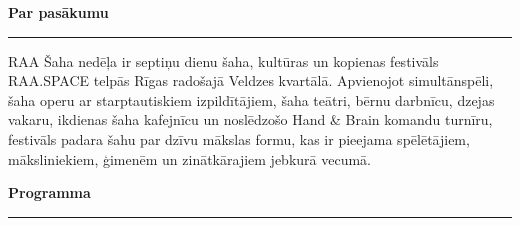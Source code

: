 \documentclass[a4paper,10pt]{article}
\newcommand{\sectionrule}[1]{%
  \vspace{3pt}%
  {\color{raared}\bfseries\large #1}\\[-3pt]%
  {\color{raared}\rule{\linewidth}{0.8pt}}%
  \vspace{2pt}%
}
\begin{document}
\begin{center}
\begin{minipage}{0.90\paperwidth}

\vspace{0.22cm}

\sectionrule{Par pasākumu}

RAA Šaha nedēļa ir septiņu dienu šaha, kultūras un kopienas festivāls RAA.SPACE telpās Rīgas radošajā Veldzes kvartālā. Apvienojot simultānspēli, šaha operu ar starptautiskiem izpildītājiem, šaha teātri, bērnu darbnīcu, dzejas vakaru, ikdienas šaha kafejnīcu un noslēdzošo Hand \& Brain komandu turnīru, festivāls padara šahu par dzīvu mākslas formu, kas ir pieejama spēlētājiem, māksliniekiem, ģimenēm un zinātkārajiem jebkurā vecumā.

\vspace{0.2cm}

\sectionrule{Programma}


\end{minipage}
\end{center}
\end{document}
